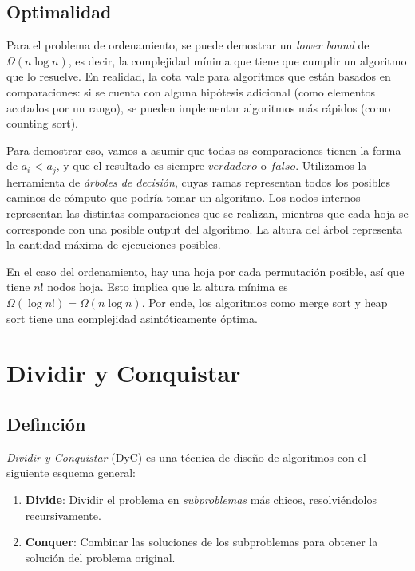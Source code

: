 \documentclass{article}
\newcommand{\BigOmega}[1]{{\Omega(#1)}}
\begin{document}
\subsection{Optimalidad}

Para el problema de ordenamiento, se puede demostrar un \textit{lower bound} de $\BigOmega{n\log{n}}$, es decir, la complejidad mínima que tiene que cumplir un algoritmo que lo resuelve. En realidad, la cota vale para algoritmos que están basados en comparaciones: si se cuenta con alguna hipótesis adicional (como elementos acotados por un rango), se pueden implementar algoritmos más rápidos (como counting sort).

Para demostrar eso, vamos a asumir que todas as comparaciones tienen la forma de $a_i$ < $a_j$, y que el resultado es siempre $verdadero$ o $falso$. Utilizamos la herramienta de \textit{árboles de decisión}, cuyas ramas representan todos los posibles caminos de cómputo que podría tomar un algoritmo. Los nodos internos representan las distintas comparaciones que se realizan, mientras que cada hoja se corresponde con una posible output del algoritmo. La altura del árbol representa la cantidad máxima de ejecuciones posibles.

En el caso del ordenamiento, hay una hoja por cada permutación posible, así que tiene $n!$ nodos hoja. Esto implica que la altura mínima es $\BigOmega{\log{n!}} = \BigOmega{n\log{n}}$. Por ende, los algoritmos como merge sort y heap sort tiene una complejidad asintóticamente óptima.

\section{Dividir y Conquistar}
\label{sec-dyc}

\subsection{Definción}

\textit{Dividir y Conquistar} (DyC) es una técnica de diseño de algoritmos con el siguiente esquema general:
\begin{enumerate}
    \item \textbf{Divide}: Dividir el problema en \textit{subproblemas} más chicos, resolviéndolos recursivamente.
    \item \textbf{Conquer}: Combinar las soluciones de los subproblemas para obtener la solución del problema original.
\end{enumerate}
\end{document}
